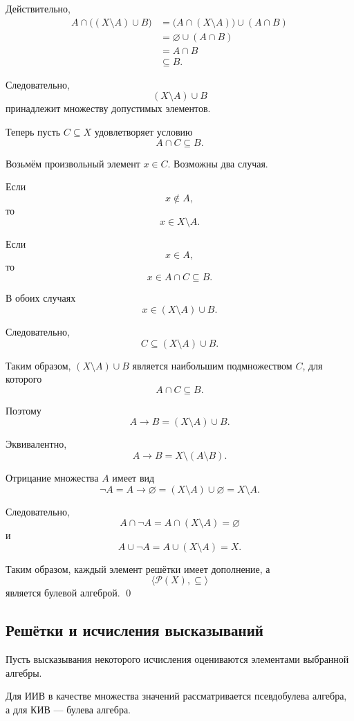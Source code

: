 \documentclass[12pt,a4paper,oneside,openany]{book}
\theoremstyle{definition}
\theoremstyle{plain}
\theoremstyle{remark}
\begin{document}
Действительно,
\[
\begin{aligned}
A\cap\bigl((X\setminus A)\cup B\bigr)
&=
\bigl(A\cap(X\setminus A)\bigr)
\cup
(A\cap B)
\\
&=
\varnothing\cup(A\cap B)
\\
&=
A\cap B
\\
&\subseteq B.
\end{aligned}
\]

Следовательно,
\[
(X\setminus A)\cup B
\]
принадлежит множеству допустимых элементов.

Теперь пусть \(C\subseteq X\) удовлетворяет условию
\[
A\cap C\subseteq B.
\]

Возьмём произвольный элемент \(x\in C\). Возможны два случая.

Если
\[
x\notin A,
\]
то
\[
x\in X\setminus A.
\]

Если
\[
x\in A,
\]
то
\[
x\in A\cap C\subseteq B.
\]

В обоих случаях
\[
x\in(X\setminus A)\cup B.
\]

Следовательно,
\[
C\subseteq(X\setminus A)\cup B.
\]

Таким образом, \((X\setminus A)\cup B\) является наибольшим
подмножеством \(C\), для которого
\[
A\cap C\subseteq B.
\]

Поэтому
\[
\boxed{
A\to B=(X\setminus A)\cup B
}.
\]

Эквивалентно,
\[
A\to B
=
X\setminus(A\setminus B).
\]

Отрицание множества \(A\) имеет вид
\[
\neg A
=
A\to\varnothing
=
(X\setminus A)\cup\varnothing
=
X\setminus A.
\]

Следовательно,
\[
A\cap\neg A
=
A\cap(X\setminus A)
=
\varnothing
\]
и
\[
A\cup\neg A
=
A\cup(X\setminus A)
=
X.
\]

Таким образом, каждый элемент решётки имеет дополнение, а
\[
\langle\mathcal P(X),\subseteq\rangle
\]
является булевой алгеброй.
\qed

\vspace{7mm}






\subsection{Решётки и исчисления высказываний}

Пусть высказывания некоторого исчисления оцениваются элементами
выбранной алгебры.

Для ИИВ в качестве множества значений рассматривается псевдобулева
алгебра, а для КИВ --- булева алгебра.
\end{document}
